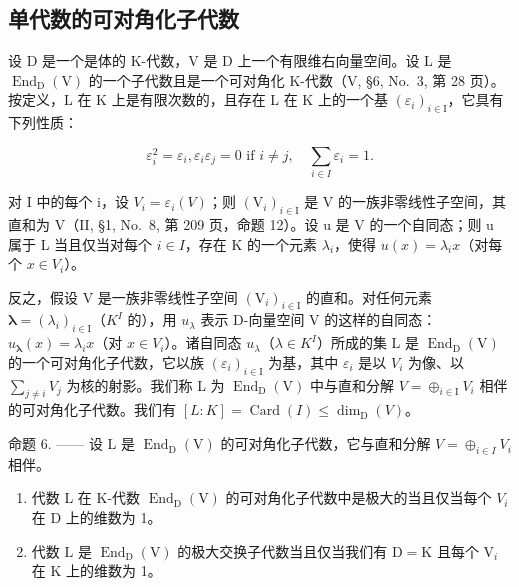 \subsection{单代数的可对角化子代数}

设 D 是一个是体的 K-代数，V 是 D 上一个有限维右向量空间。设 L 是 \(\operatorname{End}_{\mathrm{D}}(\mathrm{V})\) 的一个子代数且是一个可对角化 K-代数（V, §6, No.~3, 第 28 页）。按定义，L 在 K 上是有限次数的，且存在 L 在 K 上的一个基 \((\varepsilon_{i})_{i\in\mathrm{I}}\)，它具有下列性质：

\[
\varepsilon_ {i} ^ {2} = \varepsilon_ {i}, \varepsilon_ {i} \varepsilon_ {j} = 0 \text { if } i \neq j, \quad \sum_ {i \in I} \varepsilon_ {i} = 1.
\]

对 I 中的每个 i，设 \(V_{i} = \varepsilon_{i}(V)\)；则 \((\mathrm{V}_{i})_{i \in \mathrm{I}}\) 是 V 的一族非零线性子空间，其直和为 V（II, §1, No.~8, 第 209 页，命题 12）。设 u 是 V 的一个自同态；则 u 属于 L 当且仅当对每个 \(i \in I\)，存在 K 的一个元素 \(\lambda_{i}\)，使得 \(u(x) = \lambda_{i}x\)（对每个 \(x \in V_{i}\)）。

反之，假设 V 是一族非零线性子空间 \((\mathrm{V}_{i})_{i\in\mathrm{I}}\) 的直和。对任何元素 \(\boldsymbol{\lambda}=(\lambda_{i})_{i\in\mathrm{I}}\)（\(K^{I}\) 的），用 \(u_{\lambda}\) 表示 D-向量空间 V 的这样的自同态：\(u_{\boldsymbol{\lambda}}(x)=\lambda_{i}x\)（对 \(x\in V_{i}\)）。诸自同态 \(u_{\lambda}\)（\(\lambda\in K^{I}\)）所成的集 L 是 \(\operatorname{End}_{\mathrm{D}}(\mathrm{V})\) 的一个可对角化子代数，它以族 \((\varepsilon_{i})_{i\in\mathrm{I}}\) 为基，其中 \(\varepsilon_{i}\) 是以 \(V_{i}\) 为像、以 \(\sum_{j\neq i}V_{j}\) 为核的射影。我们称 L 为 \(\operatorname{End}_{\mathrm{D}}(\mathrm{V})\) 中与直和分解 \(V=\oplus_{i\in\mathrm{I}}V_{i}\) 相伴的可对角化子代数。我们有 \([L:K]=\operatorname{Card}(I)\leqslant\dim_{\mathrm{D}}(V)\)。

命题 6. —— 设 L 是 \(\operatorname{End}_{\mathrm{D}}(\mathrm{V})\) 的可对角化子代数，它与直和分解 \(V = \oplus_{i \in I} V_i\) 相伴。

\begin{enumerate}
\def\labelenumi{\alph{enumi})}
\item
  代数 L 在 K-代数 \(\operatorname{End}_{\mathrm{D}}(\mathrm{V})\) 的可对角化子代数中是极大的当且仅当每个 \(V_{i}\) 在 D 上的维数为 1。
\item
  代数 \(\mathrm{L}\) 是 \(\operatorname{End}_{\mathrm{D}}(\mathrm{V})\) 的极大交换子代数当且仅当我们有 \(\mathrm{D} = \mathrm{K}\) 且每个 \(\mathrm{V}_i\) 在 \(\mathrm{K}\) 上的维数为 1。
\end{enumerate}

